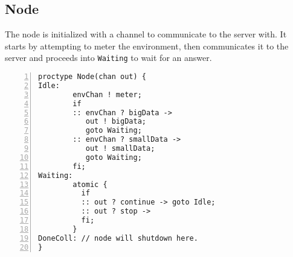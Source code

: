 \subsection{Node}

The node is initialized with a channel to communicate to the server with. It starts by attempting to meter the environment, then communicates it to the server and proceeds into \texttt{Waiting} to wait for an answer.  

\begin{lstlisting}[caption={Node code},language=Promela, numbers=left, basicstyle=\footnotesize, tabsize=2]
proctype Node(chan out) {
Idle:   
        envChan ! meter; 
        if
        :: envChan ? bigData -> 
           out ! bigData; 
           goto Waiting;
        :: envChan ? smallData -> 
           out ! smallData; 
           goto Waiting;
        fi;
Waiting:
        atomic {
          if
          :: out ? continue -> goto Idle;
          :: out ? stop -> 
          fi;
        }
DoneColl: // node will shutdown here.
}
\end{lstlisting}










